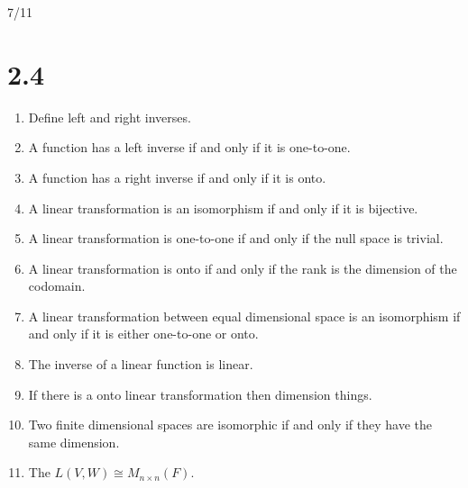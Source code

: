 \documentclass{article}
\begin{document}
\begin{center}
    7/11
\end{center}

\section{2.4}
\begin{enumerate}
    \item
        Define left and right inverses.
    \item
        A function has a left inverse if and only if it is one-to-one.
    \item
        A function has a right inverse if and only if it is onto.
    \item
        A linear transformation is an isomorphism if and only if it is
        bijective.
    \item
        A linear transformation is one-to-one if and only if the null space is
        trivial.
    \item
        A linear transformation is onto if and only if the rank is the
        dimension of the codomain.
    \item
        A linear transformation between equal dimensional space is an
        isomorphism if and only if it is either one-to-one or onto.
    \item
        The inverse of a linear function is linear.
    \item
        If there is a onto linear transformation then dimension things.
    \item
        Two finite dimensional spaces are isomorphic if and only if they have
        the same dimension.
    \item
        The $L(V,W)\cong M_{n\times n}(F)$.
\end{enumerate}
\end{document}
